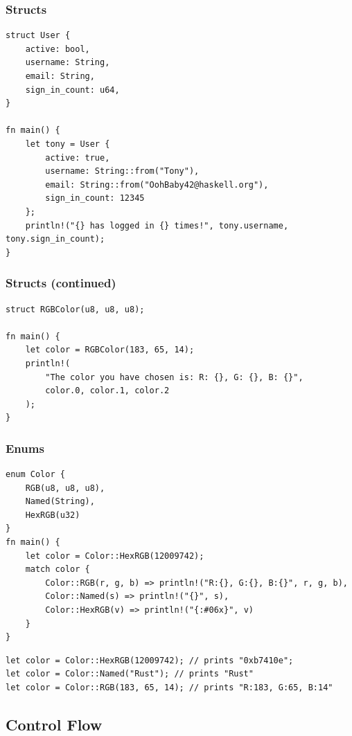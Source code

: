 \documentclass{slides}
\begin{document}
\begin{frame}[fragile]
\frametitle{Structs}

\begin{verbatim}
struct User {
    active: bool,
    username: String,
    email: String,
    sign_in_count: u64,
}

fn main() {
    let tony = User {
        active: true,
        username: String::from("Tony"),
        email: String::from("OohBaby42@haskell.org"),
        sign_in_count: 12345
    };
    println!("{} has logged in {} times!", tony.username, tony.sign_in_count);
}
\end{verbatim}
\end{frame}

\begin{frame}[fragile]
\frametitle{Structs (continued)}

\begin{verbatim}
struct RGBColor(u8, u8, u8);

fn main() {
    let color = RGBColor(183, 65, 14);
    println!(
        "The color you have chosen is: R: {}, G: {}, B: {}",
        color.0, color.1, color.2
    );
}
\end{verbatim}
\end{frame}

\begin{frame}[fragile]
\frametitle{Enums}

\begin{verbatim}
enum Color {
    RGB(u8, u8, u8),
    Named(String),
    HexRGB(u32)
}
fn main() {
    let color = Color::HexRGB(12009742);
    match color {
        Color::RGB(r, g, b) => println!("R:{}, G:{}, B:{}", r, g, b),
        Color::Named(s) => println!("{}", s),
        Color::HexRGB(v) => println!("{:#06x}", v)
    }
}
\end{verbatim}
\begin{verbatim}
let color = Color::HexRGB(12009742); // prints "0xb7410e";
let color = Color::Named("Rust"); // prints "Rust"
let color = Color::RGB(183, 65, 14); // prints "R:183, G:65, B:14"
\end{verbatim}
\end{frame}

\begin{frame}
\section{Control Flow}
\end{frame}
\end{document}
